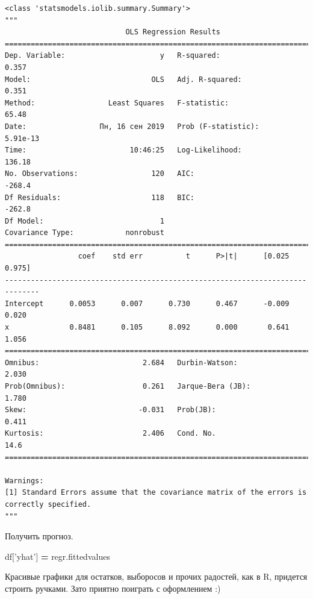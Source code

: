\documentclass[]{book}
\newenvironment{Shaded}{\begin{snugshade}}{\end{snugshade}}
\newcommand{\NormalTok}[1]{#1}
\newcommand{\OperatorTok}[1]{\textcolor[rgb]{0.81,0.36,0.00}{\textbf{#1}}}
\newcommand{\StringTok}[1]{\textcolor[rgb]{0.31,0.60,0.02}{#1}}
\begin{document}
\begin{verbatim}
<class 'statsmodels.iolib.summary.Summary'>
"""
                            OLS Regression Results                            
==============================================================================
Dep. Variable:                      y   R-squared:                       0.357
Model:                            OLS   Adj. R-squared:                  0.351
Method:                 Least Squares   F-statistic:                     65.48
Date:                 Пн, 16 сен 2019   Prob (F-statistic):           5.91e-13
Time:                        10:46:25   Log-Likelihood:                 136.18
No. Observations:                 120   AIC:                            -268.4
Df Residuals:                     118   BIC:                            -262.8
Df Model:                           1                                         
Covariance Type:            nonrobust                                         
==============================================================================
                 coef    std err          t      P>|t|      [0.025      0.975]
------------------------------------------------------------------------------
Intercept      0.0053      0.007      0.730      0.467      -0.009       0.020
x              0.8481      0.105      8.092      0.000       0.641       1.056
==============================================================================
Omnibus:                        2.684   Durbin-Watson:                   2.030
Prob(Omnibus):                  0.261   Jarque-Bera (JB):                1.780
Skew:                          -0.031   Prob(JB):                        0.411
Kurtosis:                       2.406   Cond. No.                         14.6
==============================================================================

Warnings:
[1] Standard Errors assume that the covariance matrix of the errors is correctly specified.
"""
\end{verbatim}

Получить прогноз.

\begin{Shaded}
\begin{Highlighting}[]
\NormalTok{df[}\StringTok{'yhat'}\NormalTok{] }\OperatorTok{=}\NormalTok{ regr.fittedvalues}
\end{Highlighting}
\end{Shaded}

Красивые графики для остатков, выборосов и прочих радостей, как в R, придется строить ручками. Зато приятно поиграть с оформлением :)
\end{document}
